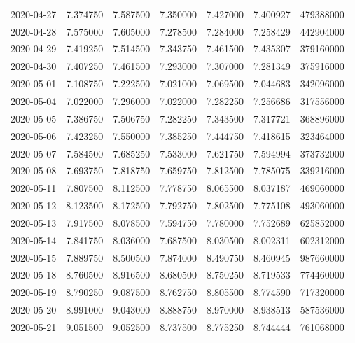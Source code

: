 \begin{tabular}{lrrrrrr}
2020-04-27 &    7.374750 &    7.587500 &    7.350000 &    7.427000 &    7.400927 &   479388000 \\
2020-04-28 &    7.575000 &    7.605000 &    7.278500 &    7.284000 &    7.258429 &   442904000 \\
2020-04-29 &    7.419250 &    7.514500 &    7.343750 &    7.461500 &    7.435307 &   379160000 \\
2020-04-30 &    7.407250 &    7.461500 &    7.293000 &    7.307000 &    7.281349 &   375916000 \\
2020-05-01 &    7.108750 &    7.222500 &    7.021000 &    7.069500 &    7.044683 &   342096000 \\
2020-05-04 &    7.022000 &    7.296000 &    7.022000 &    7.282250 &    7.256686 &   317556000 \\
2020-05-05 &    7.386750 &    7.506750 &    7.282250 &    7.343500 &    7.317721 &   368896000 \\
2020-05-06 &    7.423250 &    7.550000 &    7.385250 &    7.444750 &    7.418615 &   323464000 \\
2020-05-07 &    7.584500 &    7.685250 &    7.533000 &    7.621750 &    7.594994 &   373732000 \\
2020-05-08 &    7.693750 &    7.818750 &    7.659750 &    7.812500 &    7.785075 &   339216000 \\
2020-05-11 &    7.807500 &    8.112500 &    7.778750 &    8.065500 &    8.037187 &   469060000 \\
2020-05-12 &    8.123500 &    8.172500 &    7.792750 &    7.802500 &    7.775108 &   493060000 \\
2020-05-13 &    7.917500 &    8.078500 &    7.594750 &    7.780000 &    7.752689 &   625852000 \\
2020-05-14 &    7.841750 &    8.036000 &    7.687500 &    8.030500 &    8.002311 &   602312000 \\
2020-05-15 &    7.889750 &    8.500500 &    7.874000 &    8.490750 &    8.460945 &   987660000 \\
2020-05-18 &    8.760500 &    8.916500 &    8.680500 &    8.750250 &    8.719533 &   774460000 \\
2020-05-19 &    8.790250 &    9.087500 &    8.762750 &    8.805500 &    8.774590 &   717320000 \\
2020-05-20 &    8.991000 &    9.043000 &    8.888750 &    8.970000 &    8.938513 &   587536000 \\
2020-05-21 &    9.051500 &    9.052500 &    8.737500 &    8.775250 &    8.744444 &   761068000 \\

\end{tabular}
